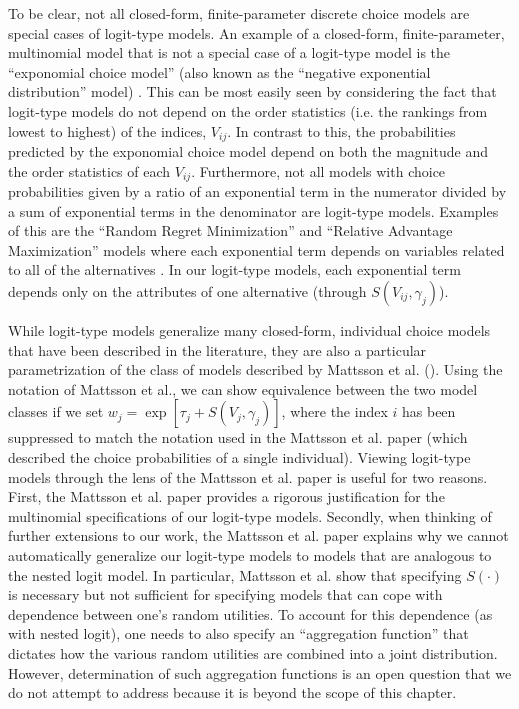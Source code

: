 To be clear, not all closed-form, finite-parameter discrete choice models are special cases of logit-type models. An example of a closed-form, finite-parameter, multinomial model that is not a special case of a logit-type model is the ``exponomial choice model'' (also known as the ``negative exponential distribution'' model) \citep{daganzo_multinomial_1979, alptekinoglu_exponomial_2016}. This can be most easily seen by considering the fact that logit-type models do not depend on the order statistics (i.e. the rankings from lowest to highest) of the indices, $V_{ij}$. In contrast to this, the probabilities predicted by the exponomial choice model depend on both the magnitude and the order statistics of each $V_{ij}$. Furthermore, not all models with choice probabilities given by a ratio of an exponential term in the numerator divided by a sum of exponential terms in the denominator are logit-type models. Examples of this are the ``Random Regret Minimization'' and ``Relative Advantage Maximization'' models where each exponential term depends on variables related to all of the alternatives \citep{chorus_random_2014, leong_contrasts_2015}. In our logit-type models, each exponential term depends only on the attributes of one alternative (through $S\left(V_{ij}, \gamma_j\right)$).

While logit-type models generalize many closed-form, individual choice models that have been described in the literature, they are also a particular parametrization of the class of models described by Mattsson et al. (\citeyear{mattsson_extreme_2014}). Using the notation of Mattsson et al., we can show equivalence between the two model classes if we set $w_{j} = \exp \left[ \tau _j + S \left( V_{j}, \gamma _j \right) \right]$, where the index $i$ has been suppressed to match the notation used in the Mattsson et al. paper (which described the choice probabilities of a single individual). Viewing logit-type models through the lens of the Mattsson et al. paper is useful for two reasons. First, the Mattsson et al. paper provides a rigorous justification for the multinomial specifications of our logit-type models. Secondly, when thinking of further extensions to our work, the Mattsson et al. paper explains why we cannot automatically generalize our logit-type models to models that are analogous to the nested logit model. In particular, Mattsson et al. show that specifying $S \left( \cdot \right)$ is necessary but not sufficient for specifying models that can cope with dependence between one's random utilities. To account for this dependence (as with nested logit), one needs to also specify an ``aggregation function'' that dictates how the various random utilities are combined into a joint distribution. However, determination of such aggregation functions is an open question that we do not attempt to address because it is beyond the scope of this chapter.

